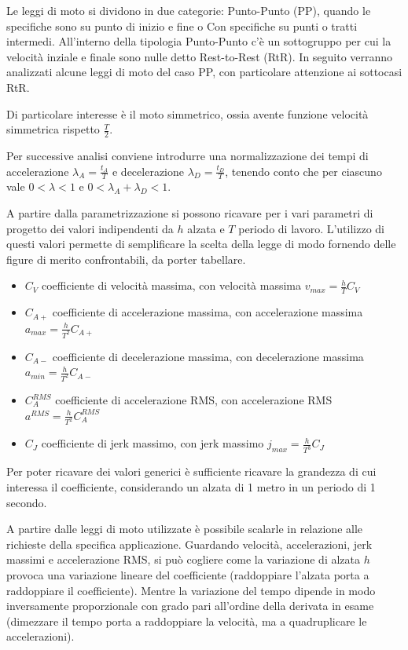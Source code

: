 Le leggi di moto si dividono in due categorie: Punto-Punto (PP), quando le specifiche sono su punto di inizio e fine o Con specifiche su punti o tratti intermedi.
All'interno della tipologia Punto-Punto c'è un sottogruppo per cui la velocità inziale e finale sono nulle detto Rest-to-Rest (RtR).
In seguito verranno analizzati alcune leggi di moto del caso PP, con particolare attenzione ai sottocasi RtR.

Di particolare interesse è il moto simmetrico, ossia avente funzione velocità simmetrica rispetto \(\frac{T}{2}\).

Per successive analisi conviene introdurre una normalizzazione dei tempi di accelerazione \(\lambda_A = \frac{t_A}{T}\) e decelerazione \(\lambda_D = \frac{t_D}{T}\), tenendo conto che per ciascuno vale \(0 < \lambda < 1\) e \(0 < \lambda_A + \lambda_D < 1\).

A partire dalla parametrizzazione si possono ricavare per i vari parametri di progetto dei valori indipendenti da \(h\) alzata e \(T\) periodo di lavoro.
L'utilizzo di questi valori permette di semplificare la scelta della legge di modo fornendo delle figure di merito confrontabili, da porter tabellare.
\begin{itemize}
    \item \(C_V\) coefficiente di velocità massima, con velocità massima \(v_{max}=\frac{h}{T}C_V\)
    \item \(C_{A+}\) coefficiente di accelerazione massima, con accelerazione massima \(a_{max}=\frac{h}{T^2}C_{A+}\)
    \item \(C_{A-}\) coefficiente di decelerazione massima, con decelerazione massima \(a_{min}=\frac{h}{T^2}C_{A-}\)
    \item \(C_A^{RMS}\) coefficiente di accelerazione RMS, con accelerazione RMS \(a^{RMS}=\frac{h}{T^2}C_A^{RMS}\)
    \item \(C_J\) coefficiente di jerk massimo, con jerk massimo \(j_{max}=\frac{h}{T^3}C_J\)
\end{itemize}
Per poter ricavare dei valori generici è sufficiente ricavare la grandezza di cui interessa il coefficiente, considerando un alzata di 1 metro in un periodo di 1 secondo.

A partire dalle leggi di moto utilizzate è possibile scalarle in relazione alle richieste della specifica applicazione.
Guardando velocità, accelerazioni, jerk massimi e accelerazione RMS, si può cogliere come la variazione di alzata \(h\) provoca una variazione lineare del coefficiente (raddoppiare l'alzata porta a raddoppiare il coefficiente).
Mentre la variazione del tempo dipende in modo inversamente proporzionale con grado pari all'ordine della derivata in esame (dimezzare il tempo porta a raddoppiare la velocità, ma a quadruplicare le accelerazioni).

